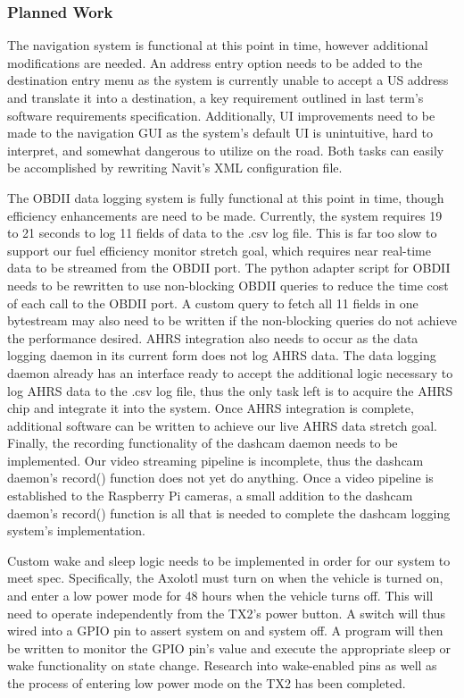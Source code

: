 \documentclass[onecolumn, draftclsnofoot,10pt, compsoc]{IEEEtran}
\begin{document}
\subsubsection{Planned Work}
The navigation system is functional at this point in time, however additional modifications are needed. An address entry option needs to be added to the destination entry menu as the system is currently unable to accept a US address and translate it into a destination, a key requirement outlined in last term's software requirements specification. Additionally, UI improvements need to be made to the navigation GUI as the system's default UI is unintuitive, hard to interpret, and somewhat dangerous to utilize on the road. Both tasks can easily be accomplished by rewriting Navit's XML configuration file.\par
The OBDII data logging system is fully functional at this point in time, though efficiency enhancements are need to be made. Currently, the system requires 19 to 21 seconds to log 11 fields of data to the .csv log file. This is far too slow to support our fuel efficiency monitor stretch goal, which requires near real-time data to be streamed from the OBDII port. The python adapter script for OBDII needs to be rewritten to use non-blocking OBDII queries to reduce the time cost of each call to the OBDII port. A custom query to fetch all 11 fields in one bytestream may also need to be written if the non-blocking queries do not achieve the performance desired.
AHRS integration also needs to occur as the data logging daemon in its current form does not log AHRS data. The data logging daemon already has an interface ready to accept the additional logic necessary to log AHRS data to the .csv log file, thus the only task left is to acquire the AHRS chip and integrate it into the system. Once AHRS integration is complete, additional software can be written to achieve our live AHRS data stretch goal.
Finally, the recording functionality of the dashcam daemon needs to be implemented. Our video streaming pipeline is incomplete, thus the dashcam daemon's record() function does not yet do anything. Once a video pipeline is established to the Raspberry Pi cameras, a small addition to the dashcam daemon's record() function is all that is needed to complete the dashcam logging system's implementation.\par
Custom wake and sleep logic needs to be implemented in order for our system to meet spec. Specifically, the Axolotl must turn on when the vehicle is turned on, and enter a low power mode for 48 hours when the vehicle turns off. This will need to operate independently from the TX2's power button. 
A switch will thus wired into a GPIO pin to assert system on and system off. A program will then be written to monitor the GPIO pin's value and execute the appropriate sleep or wake functionality on state change. Research into wake-enabled pins as well as the process of entering low power mode on the TX2 has been completed.\par
\end{document}
